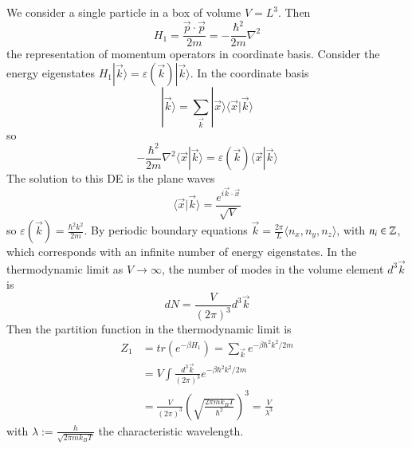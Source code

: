 \documentclass[12pt, a4paper, oneside, openright, titlepage]{book}
\begin{document}
We consider a single particle in a box of volume $V = L^3$. Then \begin{equation*}
    H_1 = \frac{\vec{p}\cdot\vec{p}}{2m} = -\frac{\hbar^2}{2m}\nabla^2 
\end{equation*}
the representation of momentum operators in coordinate basis. Consider the energy eigenstates $H_1|\vec{k}\rangle = \varepsilon(\vec{k})|\vec{k}\rangle$. In the coordinate basis \begin{equation*}
    |\vec{k}\rangle = \sum_{\vec{k}}|\vec{x}\rangle\langle \vec{x}|\vec{k}\rangle
\end{equation*}
so \begin{equation*}
    -\frac{\hbar^2}{2m}\nabla^2\langle \vec{x}|\vec{k}\rangle = \varepsilon(\vec{k})\langle \vec{x}|\vec{k}\rangle
\end{equation*}
The solution to this DE is the plane waves \begin{equation*}
    \langle \vec{x}|\vec{k}\rangle = \frac{e^{i\vec{k}\cdot\vec{x}}}{\sqrt{V}}
\end{equation*}
so $\varepsilon(\vec{k}) = \frac{\hbar^2k^2}{2m}$. By periodic boundary equations $\vec{k} = \frac{2\pi }{L}\langle n_x,n_y,n_z\rangle$, with $n_i \in \mathbb Z$, which corresponds with an infinite number of energy eigenstates. In the thermodynamic limit as $V\rightarrow \infty$, the number of modes in the volume element $d^3\vec{k}$ is \begin{equation*}
    dN = \frac{V}{(2\pi)^3}d^3\vec{k}
\end{equation*}
Then the partition function in the thermodynamic limit is \begin{align*}
    Z_1 &= tr(e^{-\beta H_1}) = \sum_{\vec{k}}e^{-\beta \hbar^2k^2/2m} \\
    &= V\int\frac{d^3\vec{k}}{(2\pi)^3}e^{-\beta\hbar^2k^2/2m} \\
    &= \frac{V}{(2\pi)^3}\left(\sqrt{\frac{2\pi mk_BT}{\hbar^2}}\right)^3 = \frac{V}{\lambda^3}
\end{align*}
with $\lambda := \frac{h}{\sqrt{2\pi mk_BT}}$ the characteristic wavelength.
\end{document}
